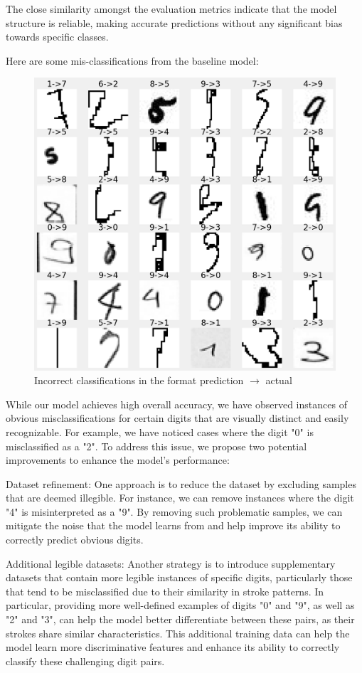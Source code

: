 \documentclass[a4paper,twoside,10pt]{article}
\begin{document}
The close similarity amongst the evaluation metrics indicate that the model structure is reliable, making accurate predictions without any significant bias towards specific classes.

Here are some mis-classifications from the baseline model:
\begin{figure}[H]
    \centering
    \includegraphics[scale=0.3]{Baseline_incorrect}
    \caption{Incorrect classifications in the format prediction $\rightarrow$ actual}
    \label{fig:baseline_incorrect}
\end{figure}

While our model achieves high overall accuracy, we have observed instances of obvious misclassifications for certain digits that are visually distinct and easily recognizable. For example, we have noticed cases where the digit "0" is misclassified as a "2". To address this issue, we propose two potential improvements to enhance the model's performance:

Dataset refinement: One approach is to reduce the dataset by excluding samples that are deemed illegible. For instance, we can remove instances where the digit "4" is misinterpreted as a "9". By removing such problematic samples, we can mitigate the noise that the model learns from and help improve its ability to correctly predict obvious digits.

Additional legible datasets: Another strategy is to introduce supplementary datasets that contain more legible instances of specific digits, particularly those that tend to be misclassified due to their similarity in stroke patterns. In particular, providing more well-defined examples of digits "0" and "9", as well as "2" and "3", can help the model better differentiate between these pairs, as their strokes share similar characteristics. This additional training data can help the model learn more discriminative features and enhance its ability to correctly classify these challenging digit pairs.
\end{document}
